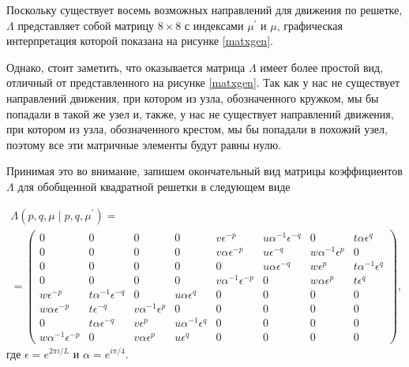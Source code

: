 Поскольку существует восемь возможных направлений для движения по решетке, $\Lambda$ представляет собой матрицу $8 \times 8$ с индексами $\mu^{'}$ и $\mu$, графическая интерпретация которой показана на рисунке \ref{matxgen}. 


Однако, стоит заметить, что оказывается матрица $\Lambda$ имеет более простой вид, отличный от представленного на рисунке  \ref{matxgen}. Так как у нас не существует направлений движения, при котором из узла, обозначенного кружком, мы бы попадали в такой же узел и, также, у нас не существует направлений движения, при котором из узла, обозначенного крестом, мы бы попадали в похожий узел, поэтому все эти матричные элементы будут равны нулю.

Принимая это во внимание, запишем окончательный вид матрицы коэффициентов $\Lambda$ для обобщенной квадратной решетки в следующем виде

\begin{multline}
\Lambda (p, q, \mu\; |\; p, q, \mu^{'}) = \\ =
\begin{pmatrix}
0 \!\!\!& 0 \!\!\!& 0 \!\!\!& 0\!\!\! & v \epsilon^{-p} \!\!\!& u \alpha^{-1} \epsilon^{-q} \!\!\!& 0 \!\!\!& t \alpha \epsilon^{q} \!\!\! \\
0 \!\!\!& 0 \!\!\!& 0 \!\!\!& 0 \!\!\!& v \alpha \epsilon^{-p}\!\!\! & u \epsilon^{-q}\!\!\! & w \alpha^{-1} \epsilon^{p}\!\!\! & 0\!\!\! \\
0 \!\!\!& 0 \!\!\!& 0 \!\!\!& 0\!\!\! & 0\!\!\! & u \alpha \epsilon^{-q} \!\!\!& w \epsilon^{p} \!\!\!& t \alpha^{-1} \epsilon^{q}\!\!\!  \\
0 \!\!\!& 0 \!\!\!& 0 \!\!\!& 0\!\!\! & v \alpha^{-1} \epsilon^{-p}\!\!\! & 0 \!\!\!& w \alpha \epsilon^{p} \!\!\!& t \epsilon^{q}\!\!\!  \\
w \epsilon^{-p} \!\!\!& t \alpha^{-1} \epsilon^{-q} \!\!\!& 0\!\!\! & u \alpha \epsilon^{q}\!\!\! & 0\!\!\! & 0\!\!\! & 0\!\!\! & 0\!\!\!  \\
w \alpha \epsilon^{-p}\!\!\! & t \epsilon^{-q} \!\!\!& v \alpha^{-1} \epsilon^{p}\!\!\! & 0 \!\!\!& 0\!\!\! & 0\!\!\! & 0\!\!\! & 0\!\!\! \\
0 \!\!\!& t \alpha \epsilon^{-q}\!\!\! & v \epsilon^{p} \!\!\!& u \alpha^{-1} \epsilon^{q}\!\!\! & 0 \!\!\!& 0\!\!\! & 0\!\!\! & 0 \!\!\! \\
w \alpha^{-1} \epsilon^{-p}\!\!\! & 0\!\!\! & v \alpha \epsilon^{p}\!\!\! & u \epsilon^{q} \!\!\!& 0\!\!\! & 0\!\!\! & 0 \!\!\!& 0 \!\!\!
\end{pmatrix},
\end{multline}
где $\epsilon = e^{2\pi i/L}$ и $\alpha = e^{i\pi/4}$.

